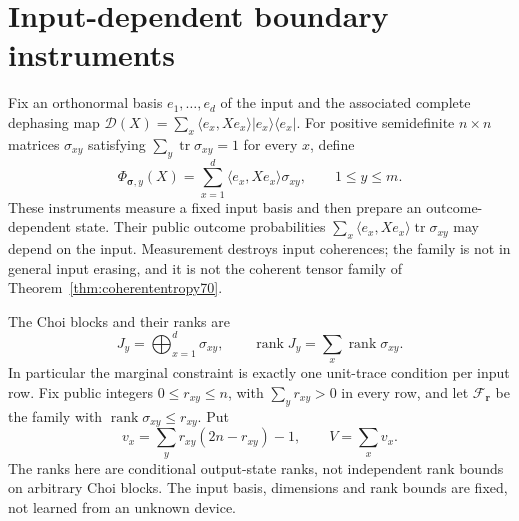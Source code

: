 \section{Input-dependent boundary instruments}\label{sec:cqboundary71}
Fix an orthonormal basis $e_1,\ldots,e_d$ of the input and the associated
complete dephasing map
$\mathcal D(X)=\sum_x\langle e_x,Xe_x\rangle|e_x\rangle\langle e_x|$.
For positive semidefinite $n\times n$ matrices $\sigma_{xy}$ satisfying
$\sum_y\operatorname{tr}\sigma_{xy}=1$ for every $x$, define
\begin{equation}\label{eq:cqfamily71}
 \Phi_{\boldsymbol\sigma,y}(X)
       =\sum_{x=1}^d\langle e_x,Xe_x\rangle\sigma_{xy},
       \qquad 1\le y\le m.
\end{equation}
These instruments measure a fixed input basis and then prepare an
outcome-dependent state. Their public outcome probabilities
$\sum_x\langle e_x,Xe_x\rangle\operatorname{tr}\sigma_{xy}$ may
depend on the input. Measurement destroys input coherences; the family
is not in general input erasing, and it is not the coherent tensor
family of Theorem~\ref{thm:coherententropy70}.

The Choi blocks and their ranks are
\begin{equation}\label{eq:cqchoi71}
 J_y=\bigoplus_{x=1}^d\sigma_{xy},\qquad
 \operatorname{rank}J_y=\sum_x\operatorname{rank}\sigma_{xy}.
\end{equation}
In particular the marginal constraint is exactly one unit-trace
condition per input row. Fix public integers $0\le r_{xy}\le n$,
with $\sum_y r_{xy}>0$ in every row, and let $\mathcal F_{\boldsymbol r}$
be the family with $\operatorname{rank}\sigma_{xy}\le r_{xy}$. Put
\begin{equation}\label{eq:cqdim71}
 v_x=\sum_y r_{xy}(2n-r_{xy})-1,\qquad V=\sum_x v_x.
\end{equation}
The ranks here are conditional output-state ranks, not independent
rank bounds on arbitrary Choi blocks. The input basis, dimensions and
rank bounds are fixed, not learned from an unknown device.

